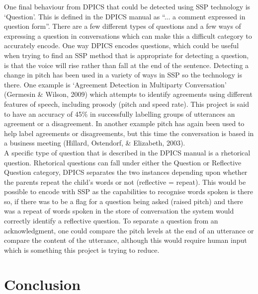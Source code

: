 \documentclass[a4paper,11pt]{report}
\begin{document}
One final behaviour from DPICS that could be detected using SSP technology is ‘Question’. This is defined in the DPICS manual as “... a comment expressed in question form”. There are a few different types of questions and a few ways of expressing a question in conversations which can make this a difficult category to accurately encode. One way DPICS encodes questions, which could be useful when trying to find an SSP method that is appropriate for detecting a question, is that the voice will rise rather than fall at the end of the sentence. Detecting a change in pitch has been used in a variety of ways in SSP so the technology is there. One example is ‘Agreement Detection in Multiparty Conversation’ (Germesin \& Wilson, 2009) which attempts to identify agreements using different features of speech, including prosody (pitch and speed rate). This project is said to have an accuracy of 45\% in successfully labelling groups of utterances an agreement or a disagreement. In another example pitch has again been used to help label agreements or disagreements, but this time the conversation is based in a business meeting (Hillard, Ostendorf, \& Elizabeth, 2003).\\

A specific type of question that is described in the DPICS manual is a rhetorical question. Rhetorical questions can fall under either the Question or Reflective Question category, DPICS separates the two instances depending upon whether the parents repeat the child’s words or not (reflective = repeat). This would be possible to encode with SSP as the capabilities to recognise words spoken is there so, if there was to be a flag for a question being asked (raised pitch) and there was a repeat of words spoken in the store of conversation the system would correctly identify a reflective question. To separate a question from an acknowledgment, one could compare the pitch levels at the end of an utterance or compare the content of the utterance, although this would require human input which is something this project is trying to reduce.

\chapter{Conclusion}
\end{document}
